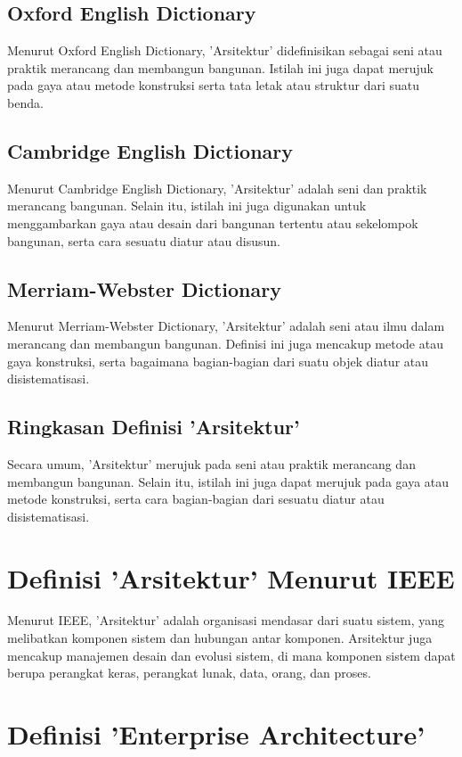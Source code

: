 \subsection{Oxford English Dictionary}
Menurut Oxford English Dictionary, 'Arsitektur' didefinisikan sebagai seni atau praktik merancang dan membangun bangunan. Istilah ini juga dapat merujuk pada gaya atau metode konstruksi serta tata letak atau struktur dari suatu benda.

\subsection{Cambridge English Dictionary}
Menurut Cambridge English Dictionary, 'Arsitektur' adalah seni dan praktik merancang bangunan. Selain itu, istilah ini juga digunakan untuk menggambarkan gaya atau desain dari bangunan tertentu atau sekelompok bangunan, serta cara sesuatu diatur atau disusun.

\subsection{Merriam-Webster Dictionary}
Menurut Merriam-Webster Dictionary, 'Arsitektur' adalah seni atau ilmu dalam merancang dan membangun bangunan. Definisi ini juga mencakup metode atau gaya konstruksi, serta bagaimana bagian-bagian dari suatu objek diatur atau disistematisasi.

\subsection{Ringkasan Definisi 'Arsitektur'}
Secara umum, 'Arsitektur' merujuk pada seni atau praktik merancang dan membangun bangunan. Selain itu, istilah ini juga dapat merujuk pada gaya atau metode konstruksi, serta cara bagian-bagian dari sesuatu diatur atau disistematisasi.

\section{Definisi 'Arsitektur' Menurut IEEE}
Menurut IEEE, 'Arsitektur' adalah organisasi mendasar dari suatu sistem, yang melibatkan komponen sistem dan hubungan antar komponen. Arsitektur juga mencakup manajemen desain dan evolusi sistem, di mana komponen sistem dapat berupa perangkat keras, perangkat lunak, data, orang, dan proses.

\section{Definisi 'Enterprise Architecture'}


